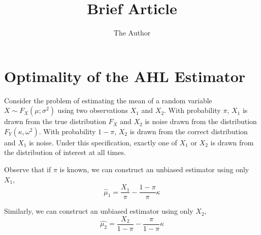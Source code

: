 \documentclass[11pt]{amsart}
\title{Brief Article}
\author{The Author}
\begin{document}
\doublespacing

\section{Optimality of the AHL Estimator}


Consider the problem of estimating the mean of a random variable $X \sim F_X(\mu; \sigma^2)$ using two observations $X_{1}$ and $X_{2}$.  With probability $\pi$, $X_1$ is drawn from the true distribution $F_X$ and $X_2$ is noise drawn from the distribution $F_Y(\kappa, \omega^2)$.  With probability $1-\pi$, $X_2$ is drawn from the correct distribution and $X_1$ is noise.  Under this specification, exactly one of $X_1$ or $X_2$ is drawn from the distribution of interest at all times.  

Observe that if $\pi$ is known, we can construct an unbiased estimator using only $X_1$,
\begin{equation}
\hat{\mu}_1 = \frac{X_1}{\pi} - \frac{1-\pi}{\pi} \kappa 
\label{mu1}
\end{equation} 

Similarly, we can construct an unbiased estimator using only $X_2$,
\begin{equation}\hat{\mu_2} = \frac{X_2}{1-\pi} - \frac{\pi}{1-\pi} \kappa \label{mu2} \end{equation}
\end{document}
